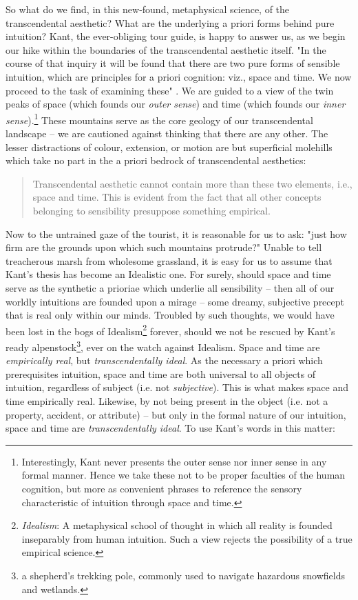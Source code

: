 So what do we find, in this new-found, metaphysical science, of the transcendental aesthetic? What are the underlying a priori forms behind pure intuition? Kant, the ever-obliging tour guide, is happy to answer us, as we begin our hike within the boundaries of the transcendental aesthetic itself. "In the course of that inquiry it will be found that there are two pure forms of sensible intuition, which are principles for a priori cognition: viz., space and time. We now proceed to the task of examining these" \autocite[B37]{hackett}. We are guided to a view of the twin peaks of space (which founds our \emph{outer sense}) and time (which founds our \emph{inner sense}).\footnote{Interestingly, Kant never presents the outer sense nor inner sense in any formal manner. Hence we take these not to be proper faculties of the human cognition, but more as convenient phrases to reference the sensory characteristic of intuition through space and time.} These mountains serve as the core geology of our transcendental landscape -- we are cautioned against thinking that there are any other. The lesser distractions of colour, extension, or motion are but superficial molehills which take no part in the a priori bedrock of transcendental aesthetics:

\begin{quote}
  Transcendental aesthetic cannot contain more than these two elements, i.e., space and time. This is evident from the fact that all other concepts belonging to sensibility presuppose something empirical.

  \autocite[B58]{hackett}
\end{quote}

Now to the untrained gaze of the tourist, it is reasonable for us to ask: "just how firm are the grounds upon which such mountains protrude?" Unable to tell treacherous marsh from wholesome grassland, it is easy for us to assume that Kant's thesis has become an Idealistic one. For surely, should space and time serve as the synthetic a prioriae which underlie all sensibility -- then all of our worldly intuitions are founded upon a mirage -- some dreamy, subjective precept that is real only within our minds. Troubled by such thoughts, we would have been lost in the bogs of Idealism\footnote{\emph{Idealism}: A metaphysical school of thought in which all reality is founded inseparably from human intuition. Such a view rejects the possibility of a true empirical science.} forever, should we not be rescued by Kant's ready alpenstock\footnote{a shepherd’s trekking pole, commonly used to navigate hazardous snowfields and wetlands.}, ever on the watch against Idealism. Space and time are \emph{empirically real}, but \emph{transcendentally ideal}. As the necessary a priori which prerequisites intuition, space and time are both universal to all objects of intuition, regardless of subject (i.e. not \emph{subjective}). This is what makes space and time empirically real. Likewise, by not being present in the object (i.e. not a property, accident, or attribute) -- but only in the formal nature of our intuition, space and time are \emph{transcendentally ideal}. To use Kant's words in this matter:

